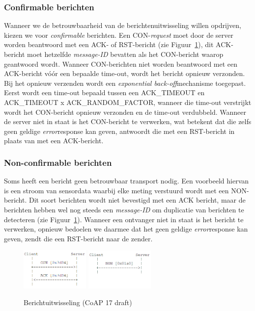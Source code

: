 \subsubsection{Confirmable berichten}

Wanneer we de betrouwbaarheid van de berichtenuitwisseling willen opdrijven, kiezen we voor \textit{confirmable} berichten. Een CON-\textit{request} moet door de server worden beantwoord met een ACK- of RST-bericht (zie Figuur~\ref{fig:berichtuitwisseling}), dit ACK-bericht moet hetzelfde \textit{message-ID} bevatten als het CON-bericht waarop geantwoord wordt. Wanneer CON-berichten niet worden beantwoord met een ACK-bericht v\'{o}\'{o}r een bepaalde time-out, wordt het bericht opnieuw verzonden. Bij het opnieuw verzenden wordt een \textit{exponential back-off}mechanisme toegepast. Eerst wordt een time-out bepaald tussen een ACK\_TIMEOUT en ACK\_TIMEOUT x ACK\_RANDOM\_FACTOR, wanneer die time-out verstrijkt wordt het CON-bericht opnieuw verzonden en de time-out verdubbeld. Wanneer de server niet in staat is het CON-bericht te verwerken, wat betekent dat die zelfs geen geldige \textit{error}response kan geven, antwoordt die met een RST-bericht in plaats van met een ACK-bericht.

\subsubsection{Non-confirmable berichten}

Soms heeft een bericht geen betrouwbaar transport nodig. Een voorbeeld hiervan is een stroom van sensordata waarbij elke meting verstuurd wordt met een NON-bericht. Dit soort berichten wordt niet bevestigd met een ACK bericht, maar de berichten hebben wel nog steeds een \textit{message-ID} om duplicatie van berichten te detecteren (zie Figuur~\ref{fig:berichtuitwisseling}). Wanneer een ontvanger niet in staat is het bericht te verwerken, opnieuw bedoelen we daarmee dat het geen geldige \textit{error}response kan geven, zendt die een RST-bericht naar de zender.

\begin{figure}[h]
\vspace{10pt}
\centering
{}
{\includegraphics[width=0.3\textwidth]{fig/CoAPConfirmable}}
\hspace{30pt}
{\includegraphics[width=0.3\textwidth]{fig/CoAPNonConfirmable}}
\caption{Berichtuitwisseling (CoAP 17 draft)}
\label{fig:berichtuitwisseling}
\end{figure}

